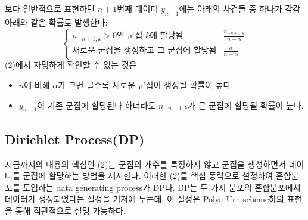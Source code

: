 \documentclass{article}
\begin{document}
\noindent 보다 일반적으로 표현하면 $n+1$번째 데이터 $y_{n+1}$에는 아래의 사건들 중 하나가 각각 아래와 같은 확률로 발생한다:
\begin{equation}
    \left\{\begin{array}{cc}
        n_{-n+1,k}>0\text{인 군집 }k\text{에 할당됨} & \displaystyle\frac{n_{-n+1,k}}{n+\alpha} \\
        \text{새로운 군집을 생성하고 그 군집에 할당됨} & \displaystyle\frac{\alpha}{n+\alpha}
    \end{array}
    \right.
\end{equation}
(2)에서 자명하게 확인할 수 있는 것은 
\begin{itemize}
    \item $n$에 비해 $\alpha$가 크면 클수록 새로운 군집이 생성될 확률이 높다.
    \item $y_{n+1}$이 기존 군집에 할당된다 하더라도 $n_{-n+1,k}$가 큰 군집에 할당될 확률이 높다.
\end{itemize}
\subsection{Dirichlet Process(DP)}
지금까지의 내용의 핵심인 (2)는 군집의 개수를 특정하지 않고 군집을 생성하면서 데이터를 군집에 할당하는 방법을 제시한다.
이러한 (2)를 핵심 동력으로 설정하여 혼합분포를 도입하는 data generating process가 DP다.
DP는 두 가지 분포의 혼합분포에서 데이터가 생성되었다는 설정을 기저에 두는데, 이 설정은 Polya Urn scheme하의 표현을 통해 직관적으로 설명 가능하다.\bigskip
\end{document}
